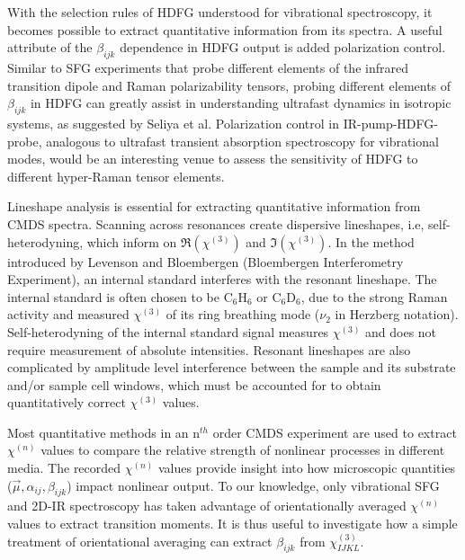 \documentclass[aip, jcp, reprint, onecolumn]{revtex4-2}
\begin{document}
With the selection rules of HDFG understood for vibrational spectroscopy, it becomes possible to extract quantitative information from its spectra.
A useful attribute of the $\beta_{ijk}$ dependence in HDFG output is added polarization control. 
Similar to SFG experiments that probe different elements of the infrared transition dipole and Raman polarizability tensors, probing different elements of $\beta_{ijk}$ in HDFG can greatly assist in understanding ultrafast dynamics in isotropic systems, as suggested by Seliya et al. \cite{Shen90, RN224, Bonn2024}
Polarization control in IR-pump-HDFG-probe, analogous to ultrafast transient absorption spectroscopy for vibrational modes, would be an interesting venue to assess the sensitivity of HDFG to different hyper-Raman tensor elements. 

Lineshape analysis is essential for extracting quantitative information from CMDS spectra.
Scanning across resonances create dispersive lineshapes, i.e, self-heterodyning, which inform on $\Re(\chi^{(3)})$ and $\Im(\chi^{(3)})$.\cite{Levenson1974_1, Levenson1974_2}
In the method introduced by Levenson and Bloembergen (Bloembergen Interferometry Experiment), an internal standard interferes with the resonant lineshape.
The internal standard is often chosen to be C$_6$H$_6$ or C$_6$D$_6$, due to the strong Raman activity and measured $\chi^{(3)}$ of its ring breathing mode ($\nu_2$ in Herzberg notation). \cite{Levenson1974_2, RN351, RN345}
Self-heterodyning of the internal standard signal measures $\chi^{(3)}$ and does not require measurement of absolute intensities. 
Resonant lineshapes are also complicated by amplitude level interference between the sample and its substrate and/or sample cell windows, which must be accounted for to obtain quantitatively correct $\chi^{(3)}$ values. \cite{RN362, RN418}

Most quantitative methods in an n$^{th}$ order CMDS experiment are used to extract $\chi^{(n)}$ values to compare the relative strength of nonlinear processes in different media. \cite{Zhu87, RN351, RN345}
The recorded $\chi^{(n)}$ values provide insight into how microscopic quantities ($\vec{\mu}, \alpha_{ij}, \beta_{ijk}$) impact nonlinear output.
To our knowledge, only vibrational SFG and 2D-IR spectroscopy has taken advantage of orientationally averaged $\chi^{(n)}$ values to extract transition moments. \cite{Shen90, Moilanen2009, RN245}
It is thus useful to investigate how a simple treatment of orientational averaging can extract $\beta_{ijk}$ from $\chi^{(3)}_{IJKL}$.
\end{document}
